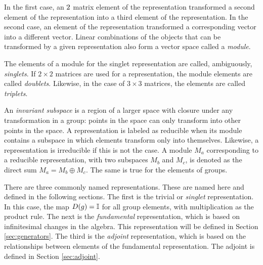In the first case, an $2\time2$ matrix element of the representation transformed a second element of the representation into a third element of the representation.
In the second case, an element of the representation transformed a corresponding vector into a different vector.
Linear combinations of the objects that can be transformed by a given representation also form a vector space called a \emph{module}.

The elements of a module for the singlet representation are called, ambiguously, \emph{singlets}. \check
If $2\times2$ matrices are used for a representation, the module elements are called \emph{doublets}. Likewise, in the case of $3\times3$ matrices, the elements are called \emph{triplets}.

An \emph{invariant subspace} is a region of a larger space with closure under any transformation in a group: points in the space can only transform into other points in the space.
A representation is labeled as reducible when its module contains a subspace in which elements transform only into themselves.
Likewise, a representation is irreducible if this is not the case. 
A module $M_a$ corresponding to a reducible representation, with two subspaces $M_b$ and $M_c$, is denoted as the direct sum $M_a=M_b\oplus M_c$. The same is true for the elements of groups.


There are three commonly named representations.
These are named here and defined in the following sections.
%
The first is the trivial or \emph{singlet} representation.
In this case, the map $D(g)=\mathbb{I}$ for all group elements, with multiplication as the product rule.
The next is the \emph{fundamental} representation, which is based on infinitesimal changes in the algebra.
This representation will be defined in Section \ref{sec:generators}.
The third is the \emph{adjoint} representation, which is based on the relationships between elements of the fundamental representation.
The adjoint is defined in Section \ref{sec:adjoint}.



